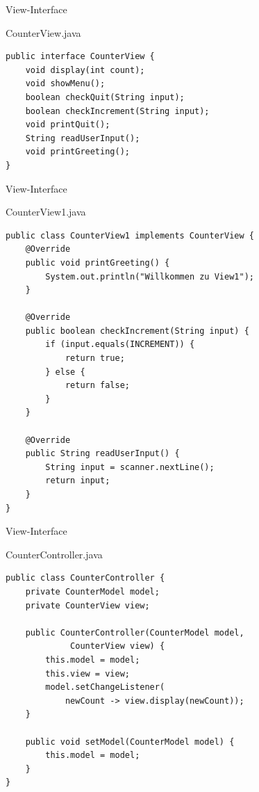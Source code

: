 \begin{frame}[fragile]{View-Interface}
	\begin{exampleblock}{CounterView.java}
 		\begin{lstlisting}
public interface CounterView {
	void display(int count);
	void showMenu();
	boolean checkQuit(String input);
	boolean checkIncrement(String input);
	void printQuit();
	String readUserInput();
	void printGreeting();
}
 		\end{lstlisting}
 	\end{exampleblock}
\end{frame}

\begin{frame}[fragile]{View-Interface}
	\begin{exampleblock}{CounterView1.java}
 		\begin{lstlisting}
public class CounterView1 implements CounterView {
	@Override
	public void printGreeting() {
		System.out.println("Willkommen zu View1");
	}
	
	@Override
	public boolean checkIncrement(String input) {
		if (input.equals(INCREMENT)) {
			return true;
		} else {
			return false;
		}
	}
	
	@Override
	public String readUserInput() {
		String input = scanner.nextLine();
		return input;
	}
}
 		\end{lstlisting}
 	\end{exampleblock}
\end{frame}

\begin{frame}[fragile]{View-Interface}
	\begin{exampleblock}{CounterController.java}
 		\begin{lstlisting}
public class CounterController {
    private CounterModel model;
    private CounterView view;

    public CounterController(CounterModel model,
    		 CounterView view) {
        this.model = model;
        this.view = view;
        model.setChangeListener(
        	newCount -> view.display(newCount)); 
    }
    
    public void setModel(CounterModel model) {
		this.model = model;
	}
}
 		\end{lstlisting}
 	\end{exampleblock}
\end{frame}

